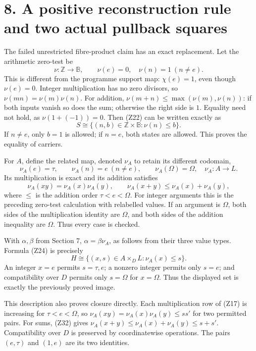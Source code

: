 \documentclass[
]{article}
\begin{document}
\section{8. A positive reconstruction rule and two actual pullback
squares}\label{a-positive-reconstruction-rule-and-two-actual-pullback-squares}

The failed unrestricted fibre-product claim has an exact replacement.
Let the arithmetic zero-test be \[
\nu:\mathbb Z\to\mathbb B,\qquad \nu(e)=0,\quad \nu(n)=1\ (n\ne e).
\tag{Z29}
\] This is different from the programme support map: \(\chi(e)=1\), even
though \(\nu(e)=0\). Integer multiplication has no zero divisors, so
\(\nu(mn)=\nu(m)\nu(n)\). For addition,
\(\nu(m+n)\le\max(\nu(m),\nu(n))\): if both inputs vanish so does the
sum; otherwise the right side is \(1\). Equality need not hold, as
\(\nu(1+(-1))=0\). Then (Z22) can be written exactly as \[
S\cong\{(n,b)\in\mathbb Z\times\mathbb B:\nu(n)\le b\}.
\tag{Z30}
\] If \(n\ne e\), only \(b=1\) is allowed; if \(n=e\), both states are
allowed. This proves the equality of carriers.

For \(A\), define the related map, denoted \(\nu_A\) to retain its
different codomain, \[
\nu_A(e)=\tau,\qquad
\nu_A(n)=e\ (n\ne e),\qquad
\nu_A(\Omega)=\Omega,
\quad \nu_A:A\to L.
\tag{Z31}
\] Its multiplication is exact and its addition satisfies \[
\nu_A(xy)=\nu_A(x)\nu_A(y),\qquad
\nu_A(x+y)\le\nu_A(x)+\nu_A(y),
\tag{Z32}
\] where \(\le\) is the addition order \(\tau<e<\Omega\). For integer
arguments this is the preceding zero-test calculation with relabelled
values. If an argument is \(\Omega\), both sides of the multiplication
identity are \(\Omega\), and both sides of the addition inequality are
\(\Omega\). Thus every case is checked.

With \(\alpha,\beta\) from Section 7, \(\alpha=\beta\nu_A\), as follows
from their three value types. Formula (Z24) is precisely \[
H\cong
\{(x,s)\in A\times_D L:\nu_A(x)\le s\}.
\tag{Z33}
\] An integer \(x=e\) permits \(s=\tau,e\); a nonzero integer permits
only \(s=e\); and compatibility over \(D\) permits only \(s=\Omega\) for
\(x=\Omega\). Thus the displayed set is exactly the previously proved
image.

This description also proves closure directly. Each multiplication row
of (Z17) is increasing for \(\tau<e<\Omega\), so
\(\nu_A(xy)=\nu_A(x)\nu_A(y)\le ss'\) for two permitted pairs. For sums,
(Z32) gives \(\nu_A(x+y)\le\nu_A(x)+\nu_A(y)\le s+s'\). Compatibility
over \(D\) is preserved by coordinatewise operations. The pairs
\((e,\tau)\) and \((1,e)\) are its two identities.
\end{document}
